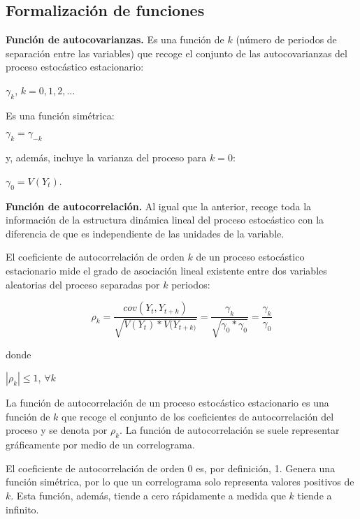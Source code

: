 \documentclass[a4paper,10pt]{article}
\begin{document}
\subsection{Formalización de funciones}

\textbf{Función de autocovarianzas.} Es una función de $k$ (número
de periodos de separación entre las variables) que recoge el conjunto de las autocovarianzas del proceso estocástico estacionario:

\begin{center}
$\gamma_k$, $k=0,1,2,...$
\end{center}

Es una función simétrica:

\begin{center}
$\gamma_k = \gamma_{-k}$
\end{center}

y, además, incluye la varianza del proceso para $k=0$:

\begin{center}
$\gamma_0 = V(Y_t)$.
\end{center}

\textbf{Función de autocorrelación.} Al igual que la anterior, recoge toda la información de la estructura dinámica lineal del proceso estocástico con la diferencia de que es independiente de las unidades de la variable.

El coeficiente de autocorrelación de orden $k$ de un proceso estocástico estacionario mide el grado de asociación lineal existente entre dos variables aleatorias del proceso separadas por $k$ periodos:

\begin{equation}
\rho_k = \frac{cov(Y_t, Y_{t+k})}{\sqrt{V(Y_t)*V(Y_{t+k)}}} = \frac{\gamma_k}{\sqrt{\gamma_0 * \gamma_0}} = \frac{\gamma_k}{\gamma_0}
\end{equation}

donde

\begin{center}
$|\rho_k| \leq 1$, $\forall k$
\end{center}

La función de autocorrelación de un proceso estocástico estacionario es una función de $k$ que
recoge el conjunto de los coeficientes de autocorrelación del proceso y se denota por $\rho_k$. La función de autocorrelación se suele representar gráficamente por medio de un correlograma.

El coeficiente de autocorrelación de orden 0 es, por definición, 1. Genera una función simétrica, por lo que un correlograma solo representa valores positivos de $k$. Esta función, además, tiende a cero rápidamente a medida que $k$ tiende a infinito.
\end{document}
